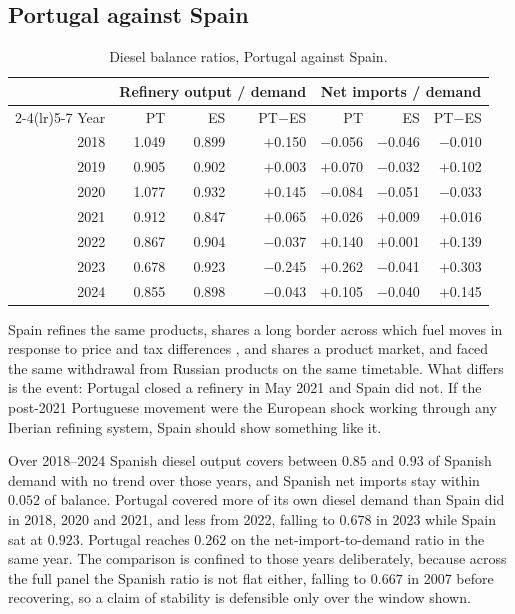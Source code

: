 \documentclass[11pt,a4paper]{article}
\begin{document}
\subsection{Portugal against Spain}

\begin{table}[htbp]
\centering
\caption{Diesel balance ratios, Portugal against Spain.}
\label{tab:spain}
\begin{tabular}{rrrrrrr}
\toprule
& \multicolumn{3}{c}{Refinery output / demand} & \multicolumn{3}{c}{Net imports / demand} \\
\cmidrule(lr){2-4}\cmidrule(lr){5-7}
Year & PT & ES & PT$-$ES & PT & ES & PT$-$ES \\
\midrule
2018 & 1.049 & 0.899 & $+$0.150 & $-$0.056 & $-$0.046 & $-$0.010 \\
2019 & 0.905 & 0.902 & $+$0.003 & $+$0.070 & $-$0.032 & $+$0.102 \\
2020 & 1.077 & 0.932 & $+$0.145 & $-$0.084 & $-$0.051 & $-$0.033 \\
2021 & 0.912 & 0.847 & $+$0.065 & $+$0.026 & $+$0.009 & $+$0.016 \\
2022 & 0.867 & 0.904 & $-$0.037 & $+$0.140 & $+$0.001 & $+$0.139 \\
2023 & 0.678 & 0.923 & $-$0.245 & $+$0.262 & $-$0.041 & $+$0.303 \\
2024 & 0.855 & 0.898 & $-$0.043 & $+$0.105 & $-$0.040 & $+$0.145 \\
\bottomrule
\end{tabular}
\end{table}

Spain refines the same products, shares a long border across which fuel moves in response to
price and tax differences \citep{leal2009prices, banfi2005fuel, teixido2024carbon}, and shares a
product market, and faced the same
withdrawal from Russian products on the same timetable. What differs is the event: Portugal
closed a refinery in May 2021 and Spain did not. If the post-2021 Portuguese movement were the
European shock working through any Iberian refining system, Spain should show something like it.

Over 2018--2024 Spanish diesel output covers between $0.85$ and $0.93$ of Spanish demand with no
trend over those years, and Spanish net imports stay within $0.052$ of balance. Portugal covered
more of its own diesel demand than Spain did in 2018, 2020 and 2021, and less from 2022, falling
to $0.678$ in 2023 while Spain sat at $0.923$. Portugal reaches $0.262$ on the net-import-to-demand
ratio in the same year. The comparison is confined to those years deliberately, because across the full panel
the Spanish ratio is not flat either, falling to $0.667$ in 2007 before recovering, so a claim of
stability is defensible only over the window shown.
\end{document}
